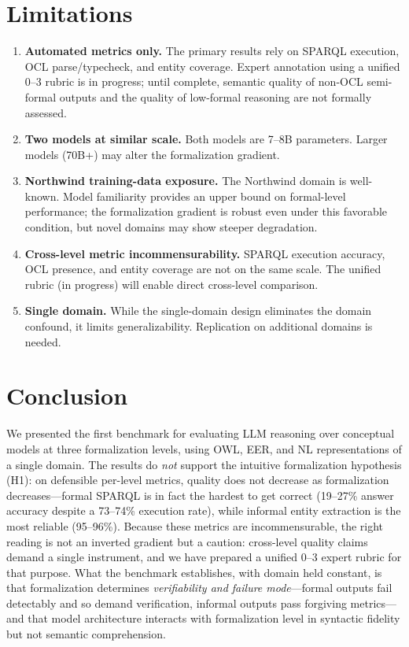 \documentclass[runningheads]{llncs}
\begin{document}
\section{Limitations}
\label{sec:limitations}

\begin{enumerate}[noitemsep]
  \item \textbf{Automated metrics only.} The primary results rely on SPARQL execution, OCL parse/typecheck, and entity coverage. Expert annotation using a unified 0--3 rubric is in progress; until complete, semantic quality of non-OCL semi-formal outputs and the quality of low-formal reasoning are not formally assessed.
  \item \textbf{Two models at similar scale.} Both models are 7--8B parameters. Larger models (70B+) may alter the formalization gradient.
  \item \textbf{Northwind training-data exposure.} The Northwind domain is well-known. Model familiarity provides an upper bound on formal-level performance; the formalization gradient is robust even under this favorable condition, but novel domains may show steeper degradation.
  \item \textbf{Cross-level metric incommensurability.} SPARQL execution accuracy, OCL presence, and entity coverage are not on the same scale. The unified rubric (in progress) will enable direct cross-level comparison.
  \item \textbf{Single domain.} While the single-domain design eliminates the domain confound, it limits generalizability. Replication on additional domains is needed.
\end{enumerate}

\section{Conclusion}
\label{sec:conclusion}

We presented the first benchmark for evaluating LLM reasoning over conceptual models at three formalization levels, using OWL, EER, and NL representations of a single domain. The results do \emph{not} support the intuitive formalization hypothesis (H1): on defensible per-level metrics, quality does not decrease as formalization decreases---formal SPARQL is in fact the hardest to get correct (19--27\% answer accuracy despite a 73--74\% execution rate), while informal entity extraction is the most reliable (95--96\%). Because these metrics are incommensurable, the right reading is not an inverted gradient but a caution: cross-level quality claims demand a single instrument, and we have prepared a unified 0--3 expert rubric for that purpose. What the benchmark establishes, with domain held constant, is that formalization determines \emph{verifiability and failure mode}---formal outputs fail detectably and so demand verification, informal outputs pass forgiving metrics---and that model architecture interacts with formalization level in syntactic fidelity but not semantic comprehension.
\end{document}

